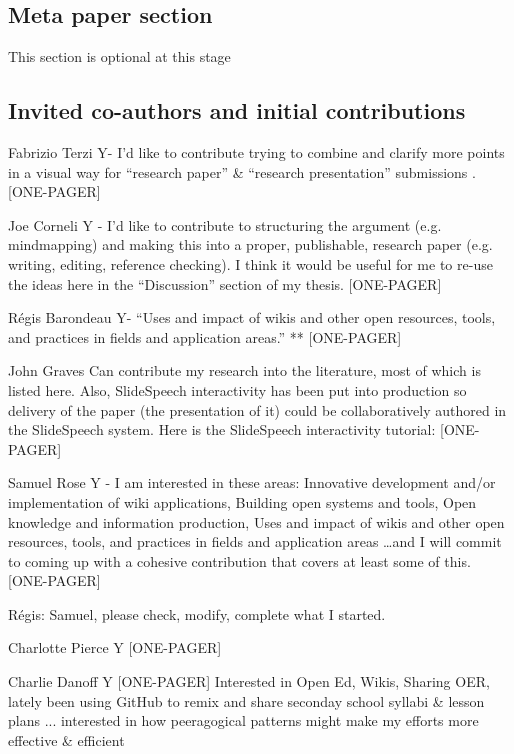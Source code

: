 \documentclass[twoside]{article}
\begin{document}
\begin{multicols}{2}
%
%
%
%

\section{Meta paper section}

This section is optional at this stage

\subsection{Invited co-authors and initial contributions}

    Fabrizio Terzi Y- I'd like to contribute trying to combine and clarify more points in a visual way for ``research paper'' \& ``research presentation'' submissions . [ONE-PAGER]

    Joe Corneli Y - I'd like to contribute to structuring the argument (e.g. mindmapping) and making this into a proper, publishable, research paper (e.g. writing, editing, reference checking). I think it would be useful for me to re-use the ideas here in the ``Discussion'' section of my thesis. [ONE-PAGER]

    R\'egis Barondeau Y- ``Uses and impact of wikis and other open resources, tools, and practices in fields and application areas.'' ** [ONE-PAGER]

    John Graves Can contribute my research into the literature, most of which is listed here. Also, SlideSpeech interactivity has been put into production so delivery of the paper (the presentation of it) could be collaboratively authored in the SlideSpeech system. Here is the SlideSpeech interactivity tutorial: [ONE-PAGER]

    Samuel Rose Y - I am interested in these areas: Innovative development and/or implementation of wiki applications, Building open systems and tools, Open knowledge and information production, Uses and impact of wikis and other open resources, tools, and practices in fields and application areas \ldots and I will commit to coming up with a cohesive contribution that covers at least some of this. [ONE-PAGER]

        R\'egis: Samuel, please check, modify, complete what I started. 

    Charlotte Pierce Y [ONE-PAGER]

    Charlie Danoff Y [ONE-PAGER] Interested in Open Ed, Wikis, Sharing OER, lately been using GitHub to remix and share seconday school syllabi \& lesson plans ... interested in how peeragogical patterns might make my efforts more effective \& efficient


\end{multicols}
\end{document}
